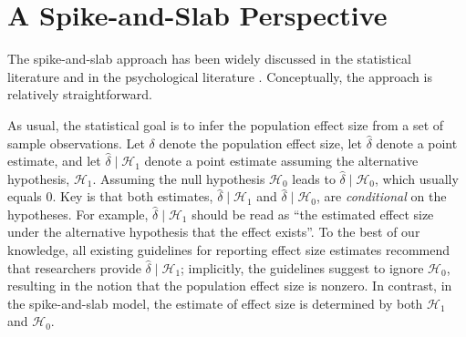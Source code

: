\documentclass[a4paper]{article}
\newcommand{\hypo}[1]{\ensuremath{\mathcal{H}_{#1}}}
\newcommand{\popDelta}{\delta}
\newcommand{\obsDelta}{\hat{\delta}}
\newenvironment{revision}{\color{black}}{\color{black}}
\begin{document}
\section*{A Spike-and-Slab Perspective}
\begin{revision}%
The spike-and-slab approach has been widely discussed in the statistical literature \parencite[e.g.,][]{ohara2009review, ishwaran2005spike, geweke1996variable, clyde1996prediction, mitchell1988bayesian} and in the psychological literature \parencite[e.g.,][]{IversonEtAl2010, yu2018bayesian, RouderEtAl2018PBR, bainter2020improving}.
Conceptually, the approach is relatively straightforward.
	
As usual, the statistical goal is to infer the population effect size from a set of sample observations. Let $\popDelta$ denote the population effect size, let $\obsDelta$ denote a point estimate, and let $\obsDelta\mid\hypo{1}$ denote a point estimate assuming the alternative hypothesis, \hypo{1}.
Assuming the null hypothesis \hypo{0} leads to $\obsDelta\mid\hypo{0}$, which usually equals 0.
Key is that both estimates, $\obsDelta\mid\hypo{1}$ and $\obsDelta\mid\hypo{0}$, are \emph{conditional} on the hypotheses. 
For example, $\obsDelta\mid\hypo{1}$ should be read as ``the estimated effect size under the alternative hypothesis that the effect exists''. To the best of our knowledge, all existing guidelines for reporting effect size estimates recommend that researchers provide $\obsDelta\mid\hypo{1}$; implicitly, the guidelines suggest to ignore \hypo{0}, resulting in the notion that the population effect size is nonzero. In contrast, in the spike-and-slab model, the estimate of effect size is determined by both \hypo{1} and \hypo{0}. 

\end{revision}%
\end{document}
